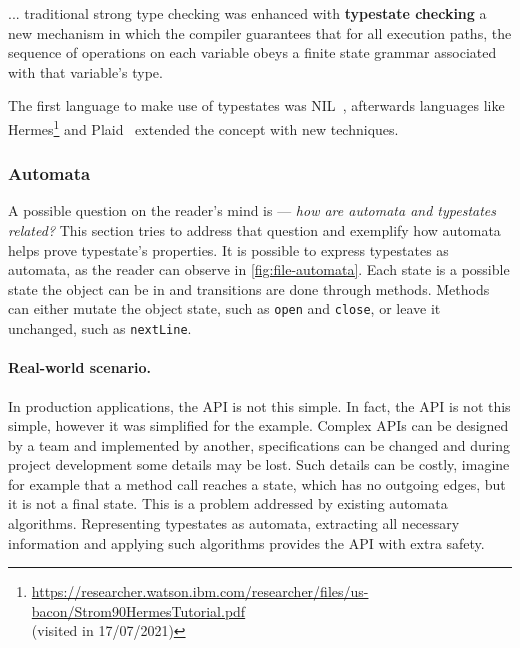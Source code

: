 \begin{displayquote}
    ... traditional strong type checking was enhanced with \textbf{typestate checking}
    a new mechanism in which the compiler guarantees that for all execution paths,
    the sequence of operations on each variable obeys a finite state grammar associated with that variable's type.
\end{displayquote}

The first language to make use of typestates was NIL~\autocite{Strom1983},
afterwards languages like Hermes\footnote{\url{https://researcher.watson.ibm.com/researcher/files/us-bacon/Strom90HermesTutorial.pdf}\\(visited in 17/07/2021)} and Plaid~\autocite{Aldrich2009}
extended the concept with new techniques.

\subsubsection*{Automata}

A possible question on the reader's mind is --- \emph{how are automata and typestates related?}
This section tries to address that question and exemplify how automata helps prove typestate's properties.
It is possible to express typestates as automata, as the reader can observe in \autoref{fig:file-automata}.
Each state is a possible state the object can be in and transitions are done through methods.
Methods can either mutate the object state, such as \texttt{open} and \texttt{close},
or leave it unchanged, such as \texttt{nextLine}.



\paragraph{Real-world scenario.}
In production applications, the \gls{API} is not this simple.
In fact, the  \gls{API} is not this simple, however it was simplified for the example.
Complex \gls{API}s can be designed by a team and implemented by another,
specifications can be changed and during project development some details may be lost.
Such details can be costly, imagine for example that a method call reaches a state, which has no outgoing edges,
but it is not a final state. This is a problem addressed by existing automata algorithms.
Representing typestates as automata, extracting all necessary information and applying such algorithms provides the \gls{API} with extra safety.

